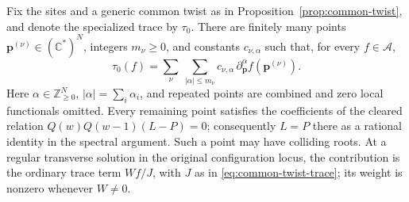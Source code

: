 \begin{corollary}\label{cor:common-twist-jets}
Fix the sites and a generic common twist as in Proposition~\ref{prop:common-twist}, and denote the specialized trace by $\tau_0$. There are finitely many points $\mathbf p^{(\nu)}\in(\mathbb C^*)^N$, integers $m_\nu\ge0$, and constants $c_{\nu,\alpha}$ such that, for every $f\in\mathcal A$,
\begin{equation}\label{eq:common-twist-jets}
 \tau_0(f)=\sum_\nu\ \sum_{|\alpha|\le m_\nu}
 c_{\nu,\alpha}\,\partial_{\mathbf p}^{\alpha}f(\mathbf p^{(\nu)}).
\end{equation}
Here $\alpha\in\mathbb Z_{\ge0}^N$, $|\alpha|=\sum_i\alpha_i$, and repeated points are combined and zero local functionals omitted. Every remaining point satisfies the coefficients of the cleared relation $Q(w)Q(w-1)(L-P)=0$; consequently $L=P$ there as a rational identity in the spectral argument. Such a point may have colliding roots. At a regular transverse solution in the original configuration locus, the contribution is the ordinary trace term $Wf/J$, with $J$ as in \eqref{eq:common-twist-trace}; its weight is nonzero whenever $W\ne0$.
\end{corollary}

